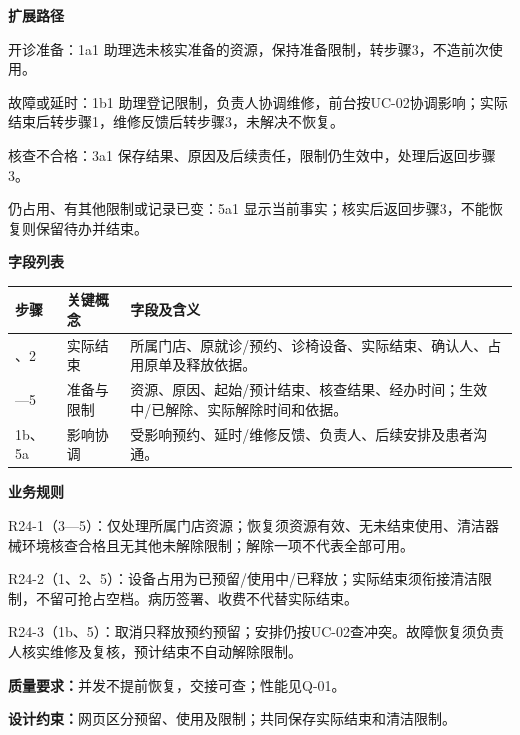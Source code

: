 \documentclass[UTF8,a4paper,zihao=-4,fontset=none]{ctexart}
\begin{document}
\noindent\textbf{扩展路径}\par
\begin{description}\setlength{\itemsep}{0pt}\setlength{\parsep}{0pt}\setlength{\topsep}{2pt}
\item[1a] 开诊准备：1a1 助理选未核实准备的资源，保持准备限制，转步骤3，不造前次使用。
\item[1b] 故障或延时：1b1 助理登记限制，负责人协调维修，前台按UC-02协调影响；实际结束后转步骤1，维修反馈后转步骤3，未解决不恢复。
\item[3a] 核查不合格：3a1 保存结果、原因及后续责任，限制仍生效中，处理后返回步骤3。
\item[5a] 仍占用、有其他限制或记录已变：5a1 显示当前事实；核实后返回步骤3，不能恢复则保留待办并结束。
\end{description}
\noindent\textbf{字段列表}\par
{\setlength{\tabcolsep}{3pt}\renewcommand{\arraystretch}{1.04}
\noindent\begin{tabular}{@{}>{\raggedright\arraybackslash}p{1.2cm}>{\raggedright\arraybackslash}p{2.2cm}>{\raggedright\arraybackslash}p{12.3cm}@{}}
\toprule
步骤 & 关键概念 & 字段及含义 \\ \midrule
1、2 & 实际结束 & 所属门店、原就诊/预约、诊椅设备、实际结束、确认人、占用原单及释放依据。 \\
3—5 & 准备与限制 & 资源、原因、起始/预计结束、核查结果、经办时间；生效中/已解除、实际解除时间和依据。 \\
1b、5a & 影响协调 & 受影响预约、延时/维修反馈、负责人、后续安排及患者沟通。 \\
\bottomrule
\end{tabular}\par}
\smallskip
\noindent\textbf{业务规则}\par
\noindent R24-1（3—5）：仅处理所属门店资源；恢复须资源有效、无未结束使用、清洁器械环境核查合格且无其他未解除限制；解除一项不代表全部可用。\par
\noindent R24-2（1、2、5）：设备占用为已预留/使用中/已释放；实际结束须衔接清洁限制，不留可抢占空档。病历签署、收费不代替实际结束。\par
\noindent R24-3（1b、5）：取消只释放预约预留；安排仍按UC-02查冲突。故障恢复须负责人核实维修及复核，预计结束不自动解除限制。\par
\smallskip
\noindent\textbf{质量要求：}并发不提前恢复，交接可查；性能见Q-01。\par
\noindent\textbf{设计约束：}网页区分预留、使用及限制；共同保存实际结束和清洁限制。\par
\endgroup
\clearpage
\end{document}
